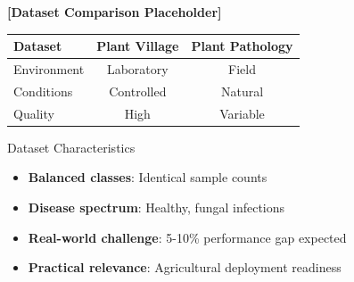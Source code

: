 \documentclass[aspectratio=43]{beamer}
\begin{document}
\begin{frame}
\begin{columns}
        \begin{column}{0.5\textwidth}
            \begin{center}
                \textbf{[Dataset Comparison Placeholder]}
                
                \vspace{0.5cm}
                \begin{tabular}{lcc}
                \hline
                \textbf{Dataset} & \textbf{Plant Village} & \textbf{Plant Pathology} \\
                \hline
                Environment & Laboratory & Field \\
                Conditions & Controlled & Natural \\
                Quality & High & Variable \\
                \hline
                \end{tabular}
            \end{center}
            
            \begin{exampleblock}{Dataset Characteristics}
                \begin{itemize}
                    \item \textbf{Balanced classes}: Identical sample counts
                    \item \textbf{Disease spectrum}: Healthy, fungal infections
                    \item \textbf{Real-world challenge}: 5-10\% performance gap expected
                    \item \textbf{Practical relevance}: Agricultural deployment readiness
                \end{itemize}
            \end{exampleblock}
        \end{column}
    \end{columns}
\end{frame}
\end{document}
